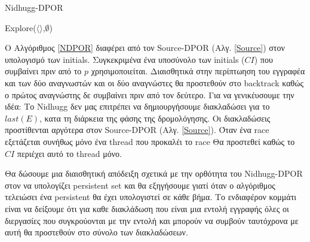 \begin{algorithm}
    \caption{Nidhugg-DPOR}
    \label{NDPOR}
    Explore($\langle \rangle$,$\emptyset$)\;
\end{algorithm}

Ο Αλγόριθμος \ref{NDPOR} διαφέρει από τον Source-DPOR (Αλγ. \ref{Source}) στον υπολογισμό των initials.
Συγκεκριμένα ένα υποσύνολο των initials ($CI$) που συμβαίνει πριν από το $p$ χρησιμοποιείται. Διαισθητικά στην περίπτωηση του εγγραφέα και 
των δύο αναγνωστών και οι δύο αναγνώστες θα προστεθούν στο backtrack καθώς ο πρώτος αναγνώστης δε συμβαίνει πριν από τον δεύτερο.
Για να γενικέυσουμε την ιδέα: 
Το Nidhugg δεν μας επιτρέπει να δημιουργήσουμε διακλαδώσει για το $last(E)$, κατα τη διάρκεια της φάσης της δρομολόγησης. Οι διακλαδώσεις προστίθενται αργότερα
στον Source-DPOR (Αλγ. \ref{Source}). Όταν ένα race εξετάζεται συνήθως μόνο ένα thread που προκαλέι το race Θα προστεθεί καθώς το $CI$ περιέχει αυτό 
το thread μόνο.

Θα δώσουμε μια διαισθητική απόδειξη σχετικά με την ορθότητα του Nidhugg-DPOR στον να υπολογίζει persistent set και θα 
εξηγήσουμε γιατί όταν ο αλγόριθμος τελειώσει ένα persistent θα έχει υπολογιστεί σε κάθε βήμα. Το ενδιαφέρον κομμάτι είναι να δείξουμε ότι για καθε διακλάδωση που
είναι μια εντολή εγγραφής όλες οι διεργασίες που συγκρούονται με την εντολή και μπορούν να συμβούν ταυτόχρονα με αυτή θα προστεθούν στο σύνολο των διακλαδώσεων.

